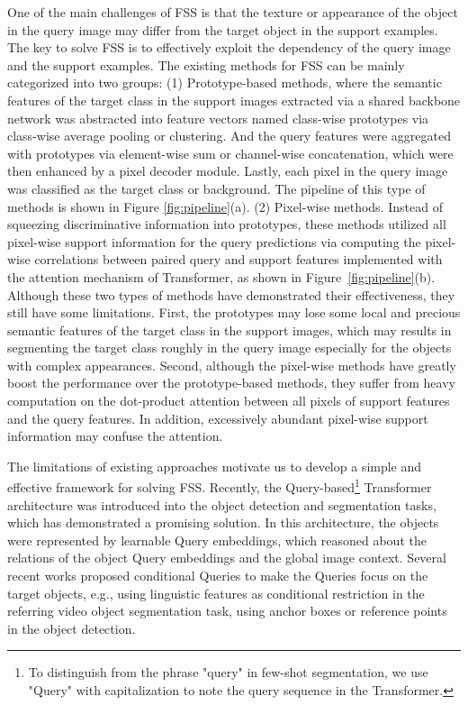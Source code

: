\documentclass[journal]{IEEEtran}
\begin{document}
One of the main challenges of FSS is that the texture or appearance of the object in the query image may differ from the target object in the support examples. The key to solve FSS is to effectively exploit the dependency of the query image and the support examples. The existing methods for FSS can be mainly categorized into two groups: (1) Prototype-based methods\cite{prototype,prototypenet,cwt,panet,sg-one,pfenet}, where the semantic features of the target class in the support images extracted via a shared backbone network was abstracted into feature vectors named class-wise prototypes via class-wise average pooling or clustering. And the query features were aggregated with prototypes via element-wise sum or channel-wise concatenation, which were then enhanced by a pixel decoder module. Lastly, each pixel in the query image was classified as the target class or background. The pipeline of this type of methods is shown in Figure \ref{fig:pipeline}(a). (2) Pixel-wise methods\cite{dan,cyctr,dcama}. Instead of squeezing discriminative information into prototypes, these methods utilized all pixel-wise support information for the query predictions via computing the pixel-wise correlations between paired query and support features implemented with the attention mechanism of Transformer, as shown in Figure~\ref{fig:pipeline}(b). Although these two types of methods have demonstrated their effectiveness, they still have some limitations. First, the prototypes may lose some local and precious semantic features of the target class in the support images, which may results in segmenting the target class roughly in the query image especially for the objects with complex appearances. Second, although the pixel-wise methods have greatly boost the performance over the prototype-based methods, they suffer from heavy computation on the dot-product attention between all pixels of support features and the query features. In addition, excessively abundant pixel-wise support information may confuse the attention\cite{cyctr}.

The limitations of existing approaches motivate us to develop a simple and effective framework for solving FSS. Recently, the Query-based\footnote{To distinguish from the phrase "query" in few-shot segmentation, we use "Query" with capitalization to note the query sequence in the Transformer.} Transformer\cite{transformer2017,vit} architecture was introduced into the object detection\cite{carion2020end} and segmentation tasks\cite{xie2021segformer,strudel2021segmenter,zheng2021rethinking,cheng2021maskformer,wang2021end}, which has demonstrated a promising solution. In this architecture, the objects were represented by learnable Query embeddings, which reasoned about the relations of the object Query embeddings and the global image context. Several recent works proposed conditional Queries to make the Queries focus on the target objects, e.g., using linguistic features as conditional restriction in the referring video object segmentation task\cite{wu2022referformer}, using anchor boxes or reference points in the object detection\cite{meng2021-CondDETR}. 
\end{document}
